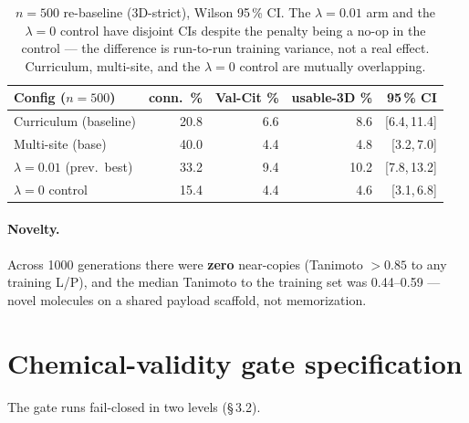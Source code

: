 \documentclass[10pt]{article}
\begin{document}
\begin{table}[t]
\caption{$n{=}500$ re-baseline (3D-strict), Wilson 95\,\% CI. The $\lambda{=}0.01$ arm and the
$\lambda{=}0$ control have disjoint CIs despite the penalty being a no-op in the control --- the
difference is run-to-run training variance, not a real effect. Curriculum, multi-site, and the
$\lambda{=}0$ control are mutually overlapping.}
\label{tab:rebaseline}
\centering\small
\setlength{\tabcolsep}{5pt}
\begin{tabular}{@{}lrrrr@{}}
\toprule
\rowcolor{tint}Config ($n{=}500$) & conn.\ \% & Val-Cit \% & usable-3D \% & 95\,\% CI \\
\midrule
Curriculum (baseline)          & 20.8 & 6.6 & 8.6  & [6.4,\,11.4] \\
Multi-site (base)              & 40.0 & 4.4 & 4.8  & [3.2,\,7.0] \\
$\lambda{=}0.01$ (prev.\ best) & 33.2 & 9.4 & 10.2 & [7.8,\,13.2] \\
$\lambda{=}0$ control          & 15.4 & 4.4 & 4.6  & [3.1,\,6.8] \\
\bottomrule
\end{tabular}
\end{table}

\paragraph{Novelty.}
Across 1000 generations there were \textbf{zero} near-copies (Tanimoto $>0.85$ to any training L/P), and
the median Tanimoto to the training set was 0.44--0.59 --- novel molecules on a shared payload scaffold,
not memorization.

\section{Chemical-validity gate specification}
\label{si:gate}

The gate runs fail-closed in two levels (\S\,3.2).
\end{document}
